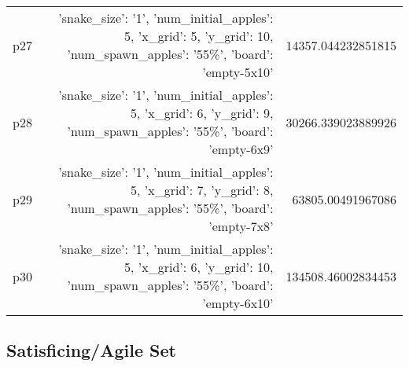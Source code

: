 \documentclass{article}
\begin{document}
\begin{center}
\begin{tabular}{r|r|r}
  p27&{'snake\_size': '1', 'num\_initial\_apples': 5, 'x\_grid': 5, 'y\_grid': 10, 'num\_spawn\_apples': '55\%', 'board': 'empty-5x10'}&14357.044232851815\\
  p28&{'snake\_size': '1', 'num\_initial\_apples': 5, 'x\_grid': 6, 'y\_grid': 9, 'num\_spawn\_apples': '55\%', 'board': 'empty-6x9'}&30266.339023889926\\
  p29&{'snake\_size': '1', 'num\_initial\_apples': 5, 'x\_grid': 7, 'y\_grid': 8, 'num\_spawn\_apples': '55\%', 'board': 'empty-7x8'}&63805.00491967086\\
  p30&{'snake\_size': '1', 'num\_initial\_apples': 5, 'x\_grid': 6, 'y\_grid': 10, 'num\_spawn\_apples': '55\%', 'board': 'empty-6x10'}&134508.46002834453
                            \end{tabular}
                            \end{center}
                    

                                \subsection*{Satisficing/Agile Set}
                                
\end{document}
